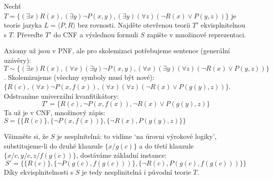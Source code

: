       
\begin{problem}
    
    Nechť $T=\{(\exists x)R(x), (\exists y)\neg P(x,y), (\exists y)(\forall z)(\neg R(x)\vee P(y,z))\}$ je teorie jazyka $L=\langle P,R\rangle$ bez rovnosti. Najděte otevřenou teorii $T'$ ekvisplnitelnou s $T$. Převeďte $T'$ do CNF a výslednou formuli $S$ zapište v množinové reprezentaci.

    \begin{solution}
        Axiomy už jsou v PNF, ale pro skolemizaci potřebujeme sentence (generální uzávěry): $T\sim\{(\exists x)R(x), (\forall x)(\exists y)\neg P(x,y), (\forall x)(\exists y)(\forall z)(\neg R(x)\vee P(y,z))\}$. Skolemizujeme (všechny symboly musí být nové):
        $\{R(c), (\forall x)\neg P(x,f(x)), (\forall x)(\forall z)(\neg R(x)\vee P(g(y),z))\}$. Odstraníme univerzální kvanfitikátory:
        $$T'=\{R(c), \neg P(x,f(x)), \neg R(x)\vee P(g(y),z)\}$$
        Ta už je v CNF, množinový zápis: $S=\{\{R(c)\},\{\neg P(x,f(x))\},\{\neg R(x),P(g(y),z)\}\}$
        
        Všimněte si, že $S$ je nesplnitelná: to vidíme `na úrovni výrokové logiky', substitujeme-li do druhé klauzule $\{x/g(c)\}$ a do třetí klauzule $\{x/c,y/c,z/f(g(c))\}$, dostáváme základní instance:
        $$
        S'=\{\{R(c)\},\{\neg P(g(c),f(g(c)))\},\{\neg R(c),P(g(c),f(g(c)))\}\}
        $$
        Díky ekvisplnitelnosti s $S$ je tedy nesplinitelná i původní teorie $T$.        
    \end{solution}

\end{problem}


